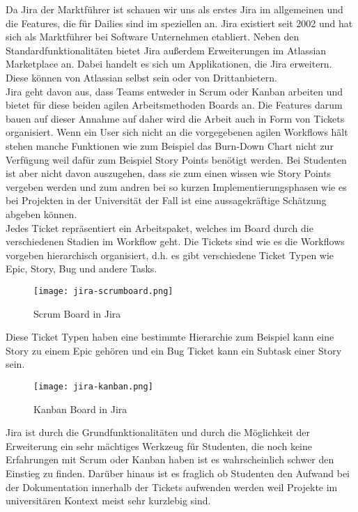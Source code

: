 Da Jira der Marktführer ist schauen wir uns als erstes Jira im allgemeinen und die Features, die für Dailies sind im speziellen an. Jira existiert seit 2002 und hat sich als Marktführer bei Software Unternehmen etabliert. Neben den Standardfunktionalitäten bietet Jira außerdem Erweiterungen im Atlassian Marketplace an. Dabei handelt es sich um Applikationen, die Jira erweitern. Diese können von Atlassian selbst sein oder von Drittanbietern.\\
Jira geht davon aus, dass Teams entweder in Scrum oder Kanban arbeiten und bietet für diese beiden agilen Arbeitsmethoden Boards an. Die Features darum bauen auf dieser Annahme auf daher wird die Arbeit auch in Form von Tickets organisiert. Wenn ein User sich nicht an die vorgegebenen agilen Workflows hält stehen manche Funktionen wie zum Beispiel das Burn-Down Chart nicht zur Verfügung weil dafür zum Beispiel Story Points benötigt werden. Bei Studenten ist aber nicht davon auszugehen, dass sie zum einen wissen wie Story Points vergeben werden und zum andren bei so kurzen Implementierungsphasen wie es bei Projekten in der Universität der Fall ist eine aussagekräftige Schätzung abgeben können. \\
Jedes Ticket repräsentiert ein Arbeitspaket, welches im Board durch die verschiedenen Stadien im Workflow geht. Die Tickets sind wie es die Workflows vorgeben hierarchisch organisiert, d.h. es gibt verschiedene Ticket Typen wie Epic, Story, Bug und andere Tasks.

\begin{figure}[H]
	\centering
	\texttt{[image: jira-scrumboard.png]}
    \caption{Scrum Board in Jira}
	\label{fig:scrumboardjira}
\end{figure}

Diese Ticket Typen haben eine bestimmte Hierarchie zum Beispiel kann eine Story zu einem Epic gehören und ein Bug Ticket kann ein Subtask einer Story sein. 

\begin{figure}[H]
	\centering
	\texttt{[image: jira-kanban.png]}
    \caption{Kanban Board in Jira}
	\label{fig:kanbanjira}
\end{figure}

Jira ist durch die Grundfunktionalitäten und durch die Möglichkeit der Erweiterung ein sehr mächtiges Werkzeug für Studenten, die noch keine Erfahrungen mit Scrum oder Kanban haben ist es wahrscheinlich schwer den Einstieg zu finden.  Darüber hinaus ist es fraglich ob Studenten den Aufwand bei der Dokumentation innerhalb der Tickets aufwenden werden weil Projekte im universitären Kontext meist sehr kurzlebig sind.  

